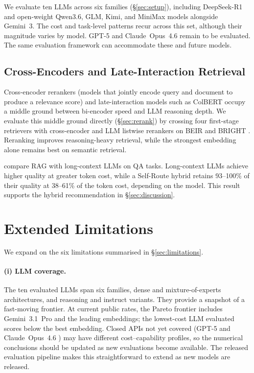 We evaluate ten LLMs across six families (\S\ref{sec:setup}), including DeepSeek-R1 and open-weight Qwen3.6, GLM, Kimi, and MiniMax models alongside Gemini~3. The cost and task-level patterns recur across this set, although their magnitude varies by model.
GPT-5 \citep{singh2026openaigpt5card} and Claude~Opus~4.6 \citep{anthropic2026claudeopus46} remain to be evaluated. The same evaluation framework can accommodate these and future models.

\subsection{Cross-Encoders and Late-Interaction Retrieval}

Cross-encoder rerankers (models that jointly encode query and document to produce a relevance score) and late-interaction models such as ColBERT \citep{khattab2020colbert} occupy a middle ground between bi-encoder speed and LLM reasoning depth.
We evaluate this middle ground directly (\S\ref{sec:rerank}) by crossing four first-stage retrievers with cross-encoder and LLM listwise rerankers on BEIR and BRIGHT \citep{sun2023rankgpt,weller2025rank1testtimecomputereranking}. Reranking improves reasoning-heavy retrieval, while the strongest embedding alone remains best on semantic retrieval.

\citet{li2024ragvslcllms} compare RAG with long-context LLMs on QA tasks. Long-context LLMs achieve higher quality at greater token cost, while a Self-Route hybrid retains 93--100\% of their quality at 38--61\% of the token cost, depending on the model. This result supports the hybrid recommendation in \S\ref{sec:discussion}.


\section{Extended Limitations}
\label{app:extended_limitations}

We expand on the six limitations summarised in \S\ref{sec:limitations}.

\paragraph{(i) LLM coverage.}
The ten evaluated LLMs span six families, dense and mixture-of-experts architectures, and reasoning and instruct variants. They provide a snapshot of a fast-moving frontier.
At current public rates, the Pareto frontier includes Gemini~3.1~Pro and the leading embeddings; the lowest-cost LLM evaluated scores below the best embedding.
Closed APIs not yet covered (GPT-5 \citep{singh2026openaigpt5card} and Claude~Opus~4.6 \citep{anthropic2026claudeopus46}) may have different cost--capability profiles, so the numerical conclusions should be updated as new evaluations become available.
The released evaluation pipeline makes this straightforward to extend as new models are released.

